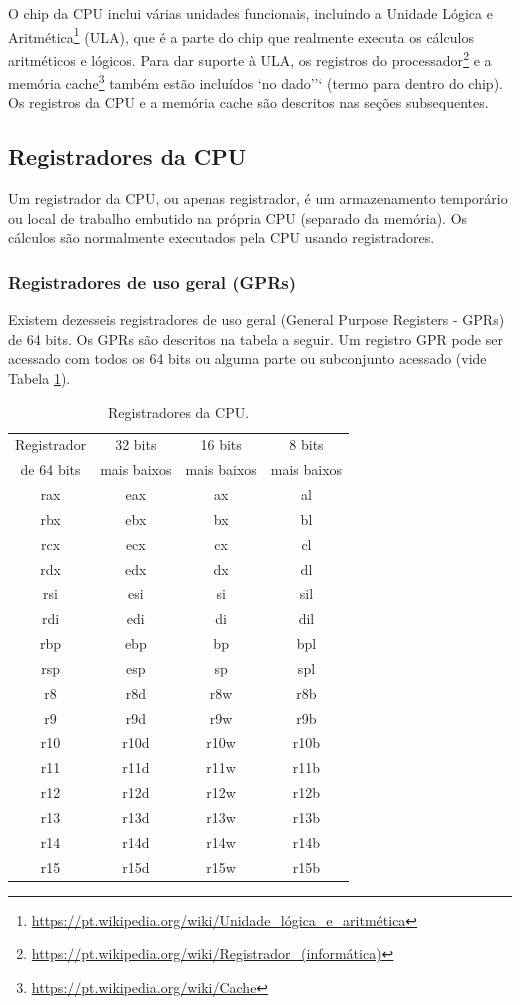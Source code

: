 O chip da CPU inclui várias unidades funcionais, incluindo a Unidade Lógica e Aritmética\footnote{ \url{https://pt.wikipedia.org/wiki/Unidade\_lógica\_e\_aritmética}} (ULA), que é a parte do chip que realmente executa os cálculos aritméticos e lógicos. Para dar suporte à ULA, os registros do processador\footnote{\url{https://pt.wikipedia.org/wiki/Registrador\_(informática)}} e a memória cache\footnote{\url{https://pt.wikipedia.org/wiki/Cache}} também estão incluídos `no dado''` (termo para dentro do chip). Os registros da CPU e a memória cache são descritos nas seções subsequentes.

\subsection{Registradores da CPU}
Um registrador da CPU, ou apenas registrador, é um armazenamento temporário ou local de trabalho embutido na própria CPU (separado da memória). Os cálculos são normalmente executados pela CPU usando registradores.

\subsubsection{Registradores de uso geral (GPRs)}
Existem dezesseis registradores de uso geral (General Purpose Registers - GPRs) de 64 bits. Os GPRs são descritos na tabela a seguir. Um registro GPR pode ser acessado com todos os 64 bits ou alguma parte ou subconjunto acessado (vide Tabela \ref{tab:registradores}).

\begin{table}[h]
	\centering
	\begin{tabular}{|c|c|c|c|}
		\hline
		\rowcolor[HTML]{C0C0C0} 
		Registrador & 32 bits & 16 bits & 8 bits \\ 
		\rowcolor[HTML]{C0C0C0} 
		de 64 bits & mais baixos & mais baixos & mais baixos \\ \hline
		rax & eax& ax & al\\ \hline
		rbx & ebx& bx & bl\\ \hline
		rcx & ecx& cx & cl\\ \hline
		rdx & edx& dx & dl\\ \hline
		rsi & esi& si & sil\\ \hline
		rdi & edi& di & dil\\ \hline
		rbp & ebp& bp & bpl\\ \hline
		rsp & esp& sp & spl\\ \hline
		r8 & r8d& r8w & r8b\\ \hline
		r9 & r9d& r9w & r9b\\ \hline
		r10 & r10d& r10w & r10b\\ \hline
		r11 & r11d& r11w & r11b\\ \hline
		r12 & r12d& r12w & r12b\\ \hline
		r13 & r13d& r13w & r13b\\ \hline
		r14 & r14d& r14w & r14b\\ \hline
		r15 & r15d& r15w & r15b\\ \hline
	\end{tabular}
	
	\caption{Registradores da CPU.}
	\label{tab:registradores}
\end{table}

